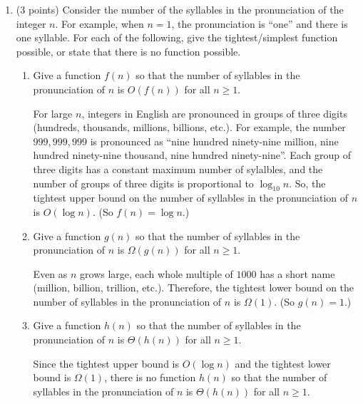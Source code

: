 \documentclass[11pt]{article}
\begin{document}



\begin{enumerate}

\item (3 points) Consider the number of the syllables in the pronunciation of the integer $n$.
For example, when $n=1$, the pronunciation is ``one'' and there is one syllable.
For each of the following, give the tightest/simplest function possible, or state that
there is no function possible.
\begin{enumerate}
    \item Give a function $f(n)$ so that the number of syllables in the pronunciation of $n$ is $O(f(n))$ for all $n \geq 1$.
    \begin{Solution}
        For large $n$, integers in English are pronounced in groups of three
        digits (hundreds, thousands, millions, billions, etc.).  For example,
        the number $999,999,999$ is pronounced as ``nine hundred ninety-nine
        million, nine hundred ninety-nine thousand, nine hundred ninety-nine''.
        Each group of three digits has a constant maximum number of sylalbles,
        and the number of groups of three digits is proportional to $\log_{10} n$.
        So,
        the tightest upper bound on the number of syllables in the pronunciation
        of $n$ is $O(\log n)$. (So $f(n) = \log n$.)
    
    \end{Solution}
    \item Give a function $g(n)$ so that the number of syllables in the pronunciation of $n$ is $\Omega(g(n))$ for all $n \geq 1$.
    \begin{Solution}
        Even as $n$ grows large, each whole multiple of $1000$ has a short name
        (million, billion, trillion, etc.). Therefore, the tightest lower bound
        on the number of syllables in the pronunciation of $n$ is $\Omega(1)$.
        (So $g(n) = 1$.)
    
    \end{Solution}
    \item Give a function $h(n)$ so that the number of syllables in the pronunciation of $n$ is $\Theta(h(n))$ for all $n \geq 1$.
    \begin{Solution}
        Since the tightest upper bound is $O(\log n)$ and the tightest lower
        bound is $\Omega(1)$, there is no function $h(n)$ so that the number of
        syllables in the pronunciation of $n$ is $\Theta(h(n))$ for all $n \geq
        1$.
    \end{Solution}
\end{enumerate}


\end{enumerate}
\end{document}
